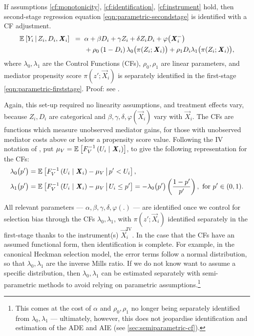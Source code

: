 \begin{proposition}
    \label{proposition:secondstage}
    If assumptions \ref{cf:monotonicity}, \ref{cf:identification}, \ref{cf:instrument} hold, then second-stage regression equation \eqref{eqn:parametric-secondstage} is identified with a CF adjustment.
    \begin{align*}
        \mathbb{E}_{} \left[ Y_i \, \middle\vert \, Z_i, D_i, \boldsymbol{\mathit{X}}_i \right] \;\; =& \;\;
            \alpha
            + \beta D_i
            + \gamma Z_i
            + \delta Z_i D_i
            + \varphi\big(\boldsymbol{\mathit{X}}_i^-\big) \\
            & \;\; + \rho_0 \left( 1 - D_i \right) \lambda_0 \big( \pi(Z_i ; \boldsymbol{\mathit{X}}_i) \big)
                + \rho_1 D_i \lambda_1 \big( \pi(Z_i ; \boldsymbol{\mathit{X}}_i) \big),
            \label{eqn:cf-secondstage}
    \end{align*}
    where $\lambda_0, \lambda_1$ are the Control Functions (CFs), $\rho_0, \rho_1$ are linear parameters, and mediator propensity score $\pi(z';\vec X_i)$ is separately identified in the first-stage \eqref{eqn:parametric-firststage}.
    Proof: see .
\end{proposition}
Again, this set-up required no linearity assumptions, and treatment effects vary, because $Z_i, D_i$ are categorical and  $\beta, \gamma, \delta , \varphi(\vec X_i)$ vary with $\vec X_i$.
The CFs are functions which measure unobserved mediator gains, for those with unobserved mediator costs above or below a propensity score value.
Following the IV notation of \cite{kline2019heckits}, put $\mu_V = \mathbb{E}_{} \left[ F_V^{-1}\left( U_i \mid \boldsymbol{\mathit{X}}_i \right) \right]$, to give the following representation for the CFs:
\begin{align*}
    \lambda_0\big(p'\big) &=
        \mathbb{E}_{} \left[  F_V^{-1}\left( U_i \mid \boldsymbol{\mathit{X}}_i \right) - \mu_V \, \middle\vert \, p' < U_i \right], \\
    \lambda_1\big(p'\big) &=
        \mathbb{E}_{} \left[  F_V^{-1}\left( U_i \mid \boldsymbol{\mathit{X}}_i \right) - \mu_V \, \middle\vert \, U_i \leq p' \right] = 
            -\lambda_0\big( p' \big) \left(\frac{1-p'}{p'}\right), \text{ for } p' \in (0,1).
\end{align*}

All relevant parameters --- $\alpha, \beta, \gamma, \delta, \varphi(.)$ --- are identified once we control for selection bias through the CFs $\lambda_0, \lambda_1$, with $\pi(z';\vec X_i)$ identified separately in the first-stage thanks to the instrument(s) $\vec X_i^{\text{IV}}$.
In the case that the CFs have an assumed functional form, then identification is complete.
For example, in the canonical Heckman selection model, the error terms follow a normal distribution, so that $\lambda_0, \lambda_1$ are the inverse Mills ratio.
If we do not know want to assume a specific distribution, then $\lambda_0, \lambda_1$ can be estimated separately with semi-parametric methods to avoid relying on parametric assumptions.\footnote{
    This comes at the cost of $\alpha$ and $\rho_0, \rho_1$ no longer being separately identified from $\lambda_0, \lambda_1$ --- ultimately, however, this does not jeopardise identification and estimation of the ADE and AIE (see \autoref{sec:semiparametric-cf}).
}


